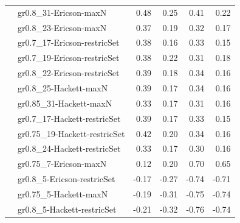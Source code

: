 {\begin{landscape}
\begin{footnotesize}
\begin{longtable}{@{}ll|rrrr@{}}
 & gr0.8\_31-Ericson-maxN & 0.48 & 0.25 & 0.41 & 0.22 \\
 & gr0.8\_23-Ericson-maxN & 0.37 & 0.19 & 0.32 & 0.17 \\
 & gr0.7\_17-Ericson-restricSet & 0.38 & 0.16 & 0.33 & 0.15 \\
 & gr0.7\_19-Ericson-restricSet & 0.38 & 0.22 & 0.31 & 0.18 \\
 & gr0.8\_22-Ericson-restricSet & 0.39 & 0.18 & 0.34 & 0.16 \\
 & gr0.8\_25-Hackett-maxN & 0.39 & 0.17 & 0.34 & 0.16 \\
 & gr0.85\_31-Hackett-maxN & 0.33 & 0.17 & 0.31 & 0.16 \\
 & gr0.7\_17-Hackett-restricSet & 0.39 & 0.17 & 0.33 & 0.15 \\
 & gr0.75\_19-Hackett-restricSet & 0.42 & 0.20 & 0.34 & 0.16 \\
 & gr0.8\_24-Hackett-restricSet & 0.33 & 0.17 & 0.30 & 0.16 \\
\addlinespace
\multirow{4}{*}{Lifelong prod.} & gr0.75\_7-Ericson-maxN & 0.12 & 0.20 & 0.70 & 0.65 \\
 & gr0.8\_5-Ericson-restricSet & -0.17 & -0.27 & -0.74 & -0.71 \\
 & gr0.75\_5-Hackett-maxN & -0.19 & -0.31 & -0.75 & -0.74 \\
 & gr0.8\_5-Hackett-restricSet & -0.21 & -0.32 & -0.76 & -0.74 \\
\bottomrule
\end{longtable}
\end{footnotesize}
\end{landscape}
\clearpage%
}



